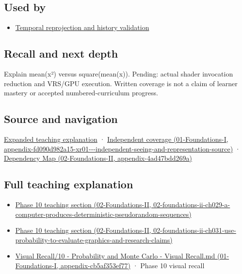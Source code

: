 \subsection{Used by}\label{appendix-4192b2bdd21e-used-by}

\begin{itemize}
\tightlist
\item
  \hyperref[appendix-0727340a4428]{Temporal reprojection and history validation}
\end{itemize}

\subsection{Recall and next depth}\label{appendix-4192b2bdd21e-recall-and-next-depth}

Explain mean(x²) versus square(mean(x)). Pending: actual shader invocation reduction and VRS/GPU execution. Written coverage is not a claim of learner mastery or accepted numbered-curriculum progress.

\subsection{Source and navigation}\label{appendix-4192b2bdd21e-source-and-navigation}

\hyperref[04-visual-computing-ii-ch042-multiresolution-work-must-preserve-the-right-information]{Expanded teaching explanation} · \href{../01-Foundations-I/main.pdf\#nameddest=appendix-fd090d982a15-xr01---independent-seeing-and-representation-source}{Independent coverage (01-Foundations-I, appendix-fd090d982a15-xr01-\/-\/-independent-seeing-and-representation-source)} · \href{../02-Foundations-II/main.pdf\#nameddest=appendix-4ad47bdd269a}{Dependency Map (02-Foundations-II, appendix-4ad47bdd269a)}

\subsection{Full teaching explanation}\label{appendix-4192b2bdd21e-full-teaching-explanation}

\begin{itemize}
\tightlist
\item
  \href{../02-Foundations-II/main.pdf\#nameddest=02-foundations-ii-ch029-a-computer-produces-deterministic-pseudorandom-sequences}{Phase 10 teaching section (02-Foundations-II, 02-foundations-ii-ch029-a-computer-produces-deterministic-pseudorandom-sequences)}
\item
  \href{../02-Foundations-II/main.pdf\#nameddest=02-foundations-ii-ch031-use-probability-to-evaluate-graphics-and-research-claims}{Phase 10 teaching section (02-Foundations-II, 02-foundations-ii-ch031-use-probability-to-evaluate-graphics-and-research-claims)}
\item
  \href{../01-Foundations-I/main.pdf\#nameddest=appendix-cb5af353ef77}{Visual Recall/10 - Probability and Monte Carlo - Visual Recall.md (01-Foundations-I, appendix-cb5af353ef77)} · Phase 10 visual recall
\end{itemize}
